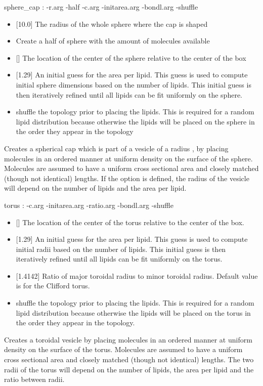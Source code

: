 \begin{code}
  sphere_cap : -r.arg -half -c.arg -initarea.arg -bondl.arg -shuffle
\end{code}
\begin{itemize}
\item {} [10.0] The radius of the whole sphere where the cap is shaped
\item {} Create a half of sphere with the amount of molecules available
\item {} [] The location of the center of the sphere relative to the center of the box
\item {} [1.29] An initial guess for the area per lipid. This guess is used to compute initial sphere dimensions based on the number of lipids. This initial guess is then iteratively refined until all lipids can be fit uniformly on the sphere.
\item {} shuffle the topology prior to placing the lipids. This is required for a random lipid distribution because otherwise the lipids will be placed on the sphere in the order they appear in the topology
\end{itemize}
Creates a spherical cap which is part of a vesicle of a radius , by placing molecules in an ordered manner at uniform density on the surface of the sphere. Molecules are assumed to have a uniform cross sectional area and closely matched (though not identical) lengths. If the option  is defined, the radius of the vesicle will depend on the number of lipids and the area per lipid.


\begin{code}
  torus : -c.arg -initarea.arg -ratio.arg -bondl.arg -shuffle
\end{code}
\begin{itemize}
\item {} [] The location of the center of the torus relative to the center of the box.
\item {} [1.29] An initial guess for the area per lipid. This guess is used to compute initial radii based on the number of lipids. This initial guess is then iteratively refined until all lipids can be fit uniformly on the torus.
\item {} [1.4142] Ratio of major toroidal radius to minor toroidal radius. Default value is for the Clifford torus.
\item {} shuffle the topology prior to placing the lipids. This is required for a random lipid distribution because otherwise the lipids will be placed on the torus in the order they appear in the topology.
\end{itemize}
Creates a toroidal vesicle by placing molecules in an ordered manner at uniform density on the surface of the torus. Molecules are assumed to have a uniform cross sectional area and closely matched (though not identical) lengths. The two radii of the torus will depend on the number of lipids, the area per lipid and the ratio between radii.


